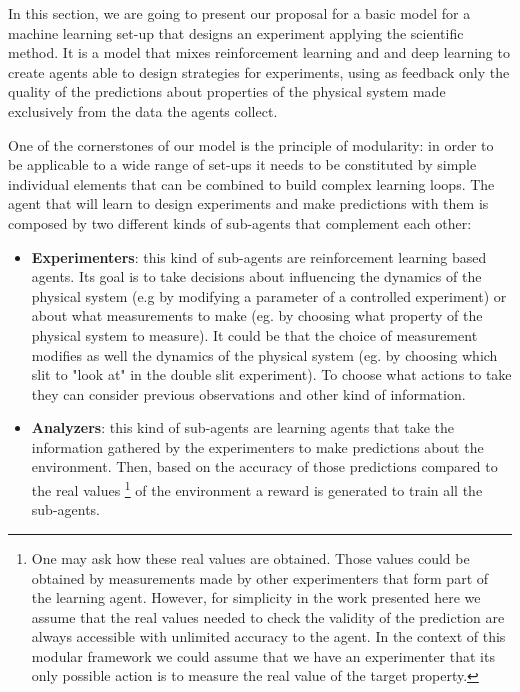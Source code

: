 \documentclass[11pt,a4paper,twoside]{report}
\newcommand{\+}{\textnormal{+} }
\theoremstyle{definition}
\numberwithin{equation}{chapter}
\begin{document}
In this section, we are going to present our proposal for a basic model for a
machine learning set-up that designs an experiment applying the scientific
method. It is a model that mixes reinforcement learning and and deep learning to
create agents able to design strategies for experiments, using as feedback only
the quality of the predictions about properties of the physical system made
exclusively from the data the agents collect. 

One of the cornerstones of our model is the principle of modularity: in order to
be applicable to a wide range of set-ups it needs to be constituted by simple
individual elements that can be combined to build complex learning loops. The
agent that will learn to design experiments and make predictions with them is
composed by two different kinds of sub-agents that complement each other:

\begin{itemize}
  \item \textbf{Experimenters}: this kind of sub-agents are reinforcement
  learning based agents. Its goal is to take decisions about influencing the
  dynamics of the physical system (e.g by modifying a parameter of a controlled
  experiment) or about what measurements to make (eg. by choosing what property
  of the physical system to measure). It could be that the choice of
  measurement modifies as well the dynamics of the physical system (eg. by
  choosing which slit to "look at" in the double slit experiment). To choose
  what actions to take they can consider previous observations and other kind of 
  information.
  \item \textbf{Analyzers}: this kind of sub-agents are learning agents
  that take the information gathered by the experimenters to make predictions
  about the environment. Then, based on the accuracy of those predictions
  compared to the real values \footnote{One may ask how these real values are
  obtained. Those values could be obtained by measurements made by other
  experimenters that form part of the learning agent. However, for simplicity in
  the work presented here we assume that the real values needed to check the
  validity of the prediction are always accessible with unlimited accuracy to
  the agent. In the context of this modular framework we could assume that we
  have an experimenter that its only possible action is to measure the real
  value of the target property.} of the environment a reward is generated to
  train all the sub-agents. 

\end{itemize}
\end{document}
